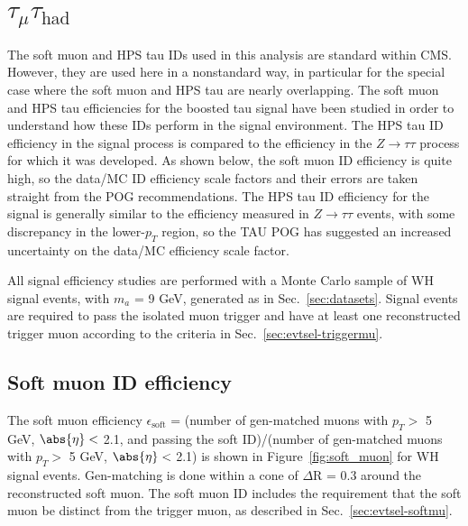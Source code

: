 \section{$\tau_{\mu}\tau_{\text{had}}$\label{lepid-eff-muPlusX}}

The soft muon and HPS tau IDs used in this analysis are standard within CMS.  However, they are used here in a nonstandard way, in particular for the special case where the soft muon and HPS tau are nearly overlapping. %
The soft muon and HPS tau efficiencies for the boosted tau signal have been studied in order to understand how these IDs perform in the signal environment. The HPS tau ID efficiency in the signal process is compared to the efficiency in the $Z\rightarrow\tau\tau$ process for which it was developed.  As shown below, the soft muon ID efficiency is quite high, so the data/MC ID efficiency scale factors and their errors are taken straight from the POG recommendations. The HPS tau ID efficiency for the signal is generally similar to the efficiency measured in $Z\rightarrow\tau\tau$ events, with some discrepancy in the lower-$p_T$ region, so the TAU POG has suggested an increased uncertainty on the data/MC efficiency scale factor.

All signal efficiency studies are performed with a Monte Carlo sample of WH signal events, with $m_{a}$ = 9 GeV, generated as in Sec.~\ref{sec:datasets}.  Signal events are required to pass the isolated muon trigger and have at least one reconstructed trigger muon according to the criteria in Sec.~\ref{sec:evtsel-triggermu}.

\subsection{Soft muon ID efficiency\label{sec:soft-mu-id}}

The soft muon efficiency $\epsilon_{\text{soft}}$ = (number of gen-matched muons with $p_T >$ 5 GeV, $\abs{\eta} <$ 2.1, and passing the soft ID)/(number of gen-matched muons with $p_T >$ 5 GeV, $\abs{\eta} <$ 2.1) is shown in Figure~\ref{fig:soft_muon} for WH signal events.  Gen-matching is done within a cone of $\Delta$R = 0.3 around the reconstructed soft muon.  The soft muon ID includes the requirement that the soft muon be distinct from the trigger muon, as described in Sec.~\ref{sec:evtsel-softmu}.


